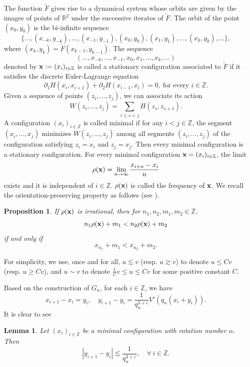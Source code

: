 \documentclass{amsart}
\newtheorem{Proposition}[Definition]{Proposition}
\newtheorem{Lemma}[Definition]{Lemma}
\theoremstyle{definition}
\begin{document}
The function $\tilde{F}$ gives rise to a dynamical
system whose orbits are given by the images of points of $\mathbb{R}^2$
under the successive iterates of $\tilde{F}$. The orbit of the point
$(x_0,y_0)$ is the bi-infinite sequence
\[\{...,(x_{-k},y_{-k}),...,(x_{-1},y_{-1}),(x_0,y_0),(x_1,y_1),...,(x_k,y_k),...\},\]
where $(x_k,y_k)=\tilde{F}(x_{k-1},y_{k-1})$. The sequence
\[(...,x_{-k},...,x_{-1},x_0,x_1,...,x_k,...)\] denoted by ${\bf{x}}:=(x_i)_{i\in\mathbb{Z}}$ is called a
stationary configuration associated to $\tilde{F}$ if it satisfies the discrete Euler-Lagrange equation
\[\partial_1 H(x_i,x_{i+1})+\partial_2 H(x_{i-1},x_i)=0,\ \text{for\ every\ }i\in\mathbb{Z}.\]
Given a sequence of points $(z_i,...,z_j)$, we can associate its
action
\[W(z_i,...,z_j)=\sum_{i\leq s<j}H(z_s,z_{s+1}).\] A configuration $(x_i)_{i\in\mathbb{Z}}$
is called minimal if for any $i<j\in \mathbb{Z}$, the segment
$(x_i,...,x_j)$ minimizes $W(z_i,...,z_j)$ among all segments
$(z_i,...,z_j)$ of the configuration  satisfying $z_i=x_i$ and
$z_j=x_j$. Then every minimal configuration is a
stationary configuration. For every minimal configuration $\bold{x}=(x_i)_{i\in\mathbb{Z}}$, the limit
\[\rho(\bold{x})=\lim_{n\rightarrow\infty}\frac{x_{i+n}-x_i}{n}\]
exists and it is independent of $i\in\mathbb{Z}$. $\rho(\bold{x})$ is called
the frequency of $\bold{x}$. We recall the orientation-preserving property as follows (see \cite[Proposition 11.2.4]{KH}).
\begin{Proposition}\label{OP}
If $\rho(\bold{x})$ is irrational, then for $n_1,n_2,m_1,m_2\in \mathbb{Z}$,
\[n_1\rho(\bold{x})+m_1<n_2\rho(\bold{x})+m_2\]
if and only if
\[x_{n_1}+m_1<x_{n_2}+m_2.\]
\end{Proposition}

For simplicity, we  use, once and for all,  $u\lesssim v$ (resp.
$u\gtrsim v$) to denote $u\leq Cv$ (resp. $u\geq Cv$), and $u\sim v$ to denote $\frac{1}{C}v\leq u\leq Cv$ for some
positive constant $C$.

Based on the construction of $G_n$, for each  $i\in \mathbb{Z}$, we have
\[x_{i+1}-x_{i}=y_i,\quad y_{i+1}-y_i=\frac{1}{q_n^{3+\varepsilon}}V'(q_n(x_i+y_i)).\]It is clear to see
\begin{Lemma}\label{disne}
Let $(x_i)_{i\in\mathbb{Z}}$ be a minimal configuration with rotation number $\alpha$.
Then \[|y_{i+1}-y_i|\lesssim \frac{1}{q_n^{3+\varepsilon}},\quad \forall \ i\in\mathbb{Z}.\]
\end{Lemma}



\vspace{2em}
\end{document}
